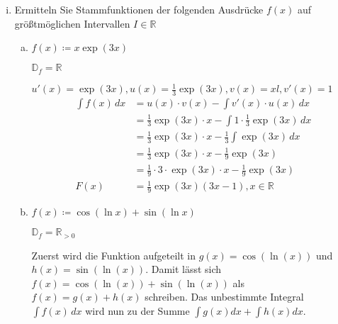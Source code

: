 \documentclass{article}
\begin{document}
\begin{enumerate}[(i)]
\item Ermitteln Sie Stammfunktionen der folgenden Ausdrücke $f(x)$ auf größtmöglichen
  Intervallen $I \in \mathbb{R}$
  \begin{enumerate}[a)]
  \item $f(x) \coloneqq x \exp(3x)$

    $\mathbb{D}_f = \mathbb{R}$

    $u'(x) = \exp(3x), u(x) = \frac{1}{3} \exp(3x), v(x) = x l, v'(x) = 1$
    \begin{align*}
      \int f(x)\,dx &= u(x) \cdot v(x) - \int v'(x) \cdot u(x) \,dx \\
                    &= \frac{1}{3} \exp(3x) \cdot x  - \int 1 \cdot \frac{1}{3}\exp(3x) \,dx \\
                    &= \frac{1}{3} \exp(3x) \cdot x  - \frac{1}{3} \int \exp(3x) \,dx \\
                    &= \frac{1}{3} \exp(3x) \cdot x  - \frac{1}{9} \exp(3x) \\
                    &= \frac{1}{9} \cdot 3 \cdot \exp(3x) \cdot x  - \frac{1}{9} \exp(3x) \\
      F(x) &= \frac{1}{9} \exp(3x) (3x - 1), x \in \mathbb{R}
    \end{align*}
  \item $f(x) \coloneqq \cos(\ln x) + \sin(\ln x)$

    $\mathbb{D}_f = \mathbb{R}_{>0}$

    Zuerst wird die Funktion aufgeteilt in $g(x) = \cos(\ln(x))$ und $h(x) = \sin(\ln(x))$.
    Damit lässt sich $f(x) = \cos(\ln(x)) + \sin(\ln(x))$ als $f(x) = g(x) + h(x)$ schreiben.
    Das unbestimmte Integral $\int f(x)\,dx$ wird nun zu der Summe $\int g(x)dx + \int h(x)dx$.


\end{enumerate}
\end{enumerate}
\end{document}
